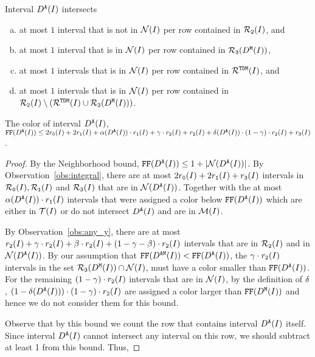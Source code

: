 {\begin{observation}
    \label{obs:any_y}
    Interval $D^\texttt{A}(I)$ intersects
    \begin{enumerate}[(a)]
        \item at most $1$ interval that is not in $\mathcal{N}(I)$ per row contained in $\mathcal{R}_\texttt{2}(I)$, and
        \item at most $1$ interval that is in $\mathcal{N}(I)$ per row contained in $\mathcal{R}_\texttt{3}(D^\texttt{M}(I))$,
        \item at most $1$ intervals that is in $\mathcal{N}(I)$ per row contained in $\mathcal{R}^{\texttt{TDM}}(I)$, and
        \item at most $1$ intervals that is in $\mathcal{N}(I)$ per row contained in $\mathcal{R}_\texttt{2}(I) \setminus (\mathcal{R}^{\texttt{TDM}}(I) \cup \mathcal{R}_\texttt{3}(D^\texttt{M}(I)) )$.
    \end{enumerate}
\end{observation}

\begin{lemma}
    \label{lem:any_uvw}
    The color of interval $D^\texttt{A}(I)$,
    $\text{\texttt{FF}}(D^\texttt{A}(I)) \leq 2r_\texttt{0}(I) + 2r_\texttt{1}(I) + \alpha(D^\texttt{A}(I)) \cdot r_\texttt{1}(I) + \gamma  \cdot r_\texttt{2}(I) + r_\texttt{2}(I) + \delta(D^\texttt{A}(I)) \cdot (1 - \gamma ) \cdot r_\texttt{2}(I) + r_\texttt{3}(I)$. 
\end{lemma}

\begin{proof}
    By the Neighborhood bound, $\text{\texttt{FF}}(D^\texttt{A}(I)) \leq 1 + |\mathcal{N}(D^\texttt{A}(I))|$.
    By Observation~\ref{obs:integral}, there are at most $ 2r_\texttt{0}(I) + 2r_\texttt{1}(I) + r_\texttt{3}(I)$ intervals in $\mathcal{R}_\texttt{0}(I), \mathcal{R}_\texttt{1}(I)$ and $\mathcal{R}_\texttt{3}(I)$ that are in $\mathcal{N}(D^\texttt{A}(I))$.
    Together with the at most $\alpha(D^\texttt{A}(I)) \cdot r_\texttt{1}(I)$ intervals that were assigned a color below $\text{\texttt{FF}}(D^\texttt{A}(I))$ which are either in $\mathcal{T}(I)$ or do not intersect $D^\texttt{A}(I)$ and are in $\mathcal{M}(I)$.
    
    By Observation~\ref{obs:any_y}, there are at most $r_\texttt{2}(I) + \gamma \cdot r_\texttt{2}(I) + \beta \cdot r_\texttt{2}(I) + (1 - \gamma - \beta) \cdot r_\texttt{2}(I)$ intervals that are in $\mathcal{R}_\texttt{2}(I)$ and in $\mathcal{N}(D^\texttt{A}(I))$.
    By our assumption that $\text{\texttt{FF}}(D^\texttt{AM}(I)) < \text{\texttt{FF}}(D^\texttt{A}(I))$, the $\gamma  \cdot r_\texttt{2}(I)$ intervals in the set $\mathcal{R}_\texttt{3}(D^\texttt{M}(I)) \cap \mathcal{N}(I)$, must have a color smaller than $\text{\texttt{FF}}(D^\texttt{A}(I))$.
    For the remaining $(1 - \gamma) \cdot r_\texttt{2}(I)$ intervals that are in $\mathcal{N}(I)$, by the definition of $\delta$,  $(1 - \delta(D^\texttt{A}(I))) \cdot (1 - \gamma) \cdot r_\texttt{2}(I)$ are assigned a color larger than $\text{\texttt{FF}}(D^\texttt{M}(I))$ and hence we do not consider them for this bound.
    
    Observe that by this bound we count the row that contains interval $D^\texttt{A}(I)$ itself.
    Since interval $D^\texttt{A}(I)$ cannot intersect any interval on this row, we should subtract at least 1 from this bound. 
    Thus,


\end{proof}}
